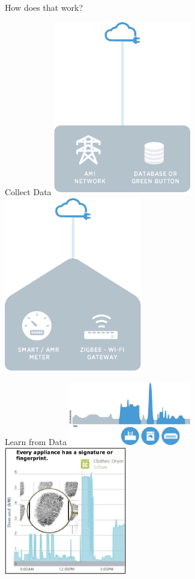 \documentclass[xcolor=svgnames,handout]{beamer}
\begin{document}
\begin{frame}
How does that work?
\end{frame}

\begin{frame}{Collect Data}
  \includegraphics[width=0.45\textwidth]{technology_workds_with_ami}
  \hfill
  \includegraphics[width=0.45\textwidth]{technology_workds_with_han}
\end{frame}


\begin{frame}{Learn from Data}
  \includegraphics[width=0.4\textwidth]{technology_algorithms_work}
  \hfill
  \includegraphics[width=0.4\textwidth]{appliance-signature}
\end{frame}
\end{document}
